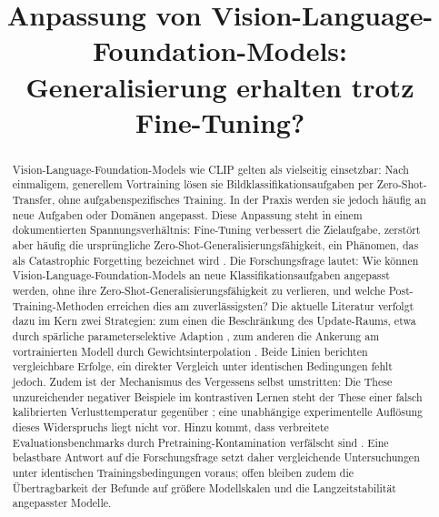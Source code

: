 \documentclass[conference]{IEEEtran}
\begin{document}
\title{Anpassung von Vision-Language-Foundation-Models:\\
Generalisierung erhalten trotz Fine-Tuning?}

\author{
\and
{}
\and
{}
}

\maketitle

\begin{abstract}
Vision-Language-Foundation-Models wie CLIP gelten als vielseitig einsetzbar: Nach einmaligem, generellem Vortraining lösen sie Bildklassifikationsaufgaben per Zero-Shot-Transfer, ohne aufgabenspezifisches Training. In der Praxis werden sie jedoch häufig an neue Aufgaben oder Domänen angepasst. Diese Anpassung steht in einem dokumentierten Spannungsverhältnis: Fine-Tuning verbessert die Zielaufgabe, zerstört aber häufig die ursprüngliche Zero-Shot-Generalisierungsfähigkeit, ein Phänomen, das als Catastrophic Forgetting bezeichnet wird \cite{wisefit, saft, clipprefine}. Die Forschungsfrage lautet: Wie können Vision-Language-Foundation-Models an neue Klassifikationsaufgaben angepasst werden, ohne ihre Zero-Shot-Generalisierungsfähigkeit zu verlieren, und welche Post-Training-Methoden erreichen dies am zuverlässigsten? Die aktuelle Literatur verfolgt dazu im Kern zwei Strategien: zum einen die Beschränkung des Update-Raums, etwa durch spärliche parameterselektive Adaption \cite{saft}, zum anderen die Ankerung am vortrainierten Modell durch Gewichtsinterpolation \cite{wisefit}. Beide Linien berichten vergleichbare Erfolge, ein direkter Vergleich unter identischen Bedingungen fehlt jedoch. Zudem ist der Mechanismus des Vergessens selbst umstritten: Die These unzureichender negativer Beispiele im kontrastiven Lernen \cite{clipprefine} steht der These einer falsch kalibrierten Verlusttemperatur gegenüber \cite{comclip}; eine unabhängige experimentelle Auflösung dieses Widerspruchs liegt nicht vor. Hinzu kommt, dass verbreitete Evaluationsbenchmarks durch Pretraining-Kontamination verfälscht sind \cite{kravets}. Eine belastbare Antwort auf die Forschungsfrage setzt daher vergleichende Untersuchungen unter identischen Trainingsbedingungen voraus; offen bleiben zudem die Übertragbarkeit der Befunde auf größere Modellskalen und die Langzeitstabilität angepasster Modelle.
\end{abstract}
\end{document}
